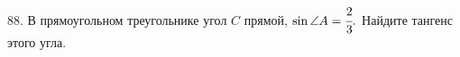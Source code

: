 88. В прямоугольном треугольнике угол $C$ прямой, $\sin \angle A=\cfrac{2}{3}.$ Найдите тангенс этого угла.\\

